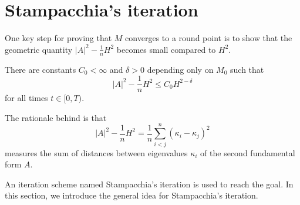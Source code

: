 \section{Stampacchia's iteration}
One key step for proving that $M$ converges to a round point is to show that the geometric quantity $\left| A \right| ^2-\frac{1}{n}H^2$ becomes small compared to $H^2$.

\begin{theorem} \label{PinEs}
	There are constants $C_0<\infty $ and $\delta >0$ depending only on $M_0$ such that 
	\[\left| A \right| ^2-\frac{1}{n}H^2 \leq C_0 H^{2-\delta }\]
	for all times $t \in [0,T)$. 
\end{theorem}

The rationale behind is that
\[\left| A \right| ^2-\frac{1}{n}H^2=\frac{1}{n}\sum_{i<j}^{n}(\kappa _i-\kappa _j)^2\]
measures the sum of distances between eigenvalues $\kappa _i$ of the second fundamental form $A$. 

An iteration scheme named Stampacchia's iteration is used to reach the goal. In this section, we introduce the general idea for Stampacchia's iteration.


